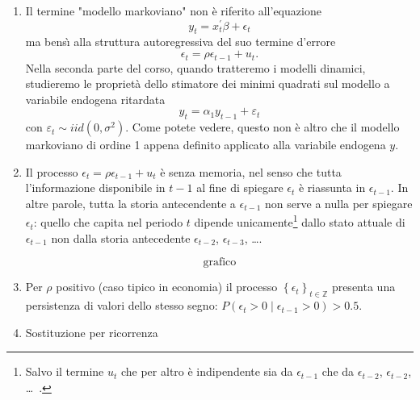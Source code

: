 \documentclass[a4paper]{report}
\newcounter{ese}
\newcounter{def}
\theoremstyle{remark}
\begin{document}
\begin{enumerate}
\item Il termine "modello markoviano" non \`{e} riferito all'equazione%
\begin{equation*}
y_{t}=x_{t}^{\prime }\beta +\epsilon _{t}
\end{equation*}%
ma bens\`{\i} alla struttura autoregressiva del suo termine d'errore 
\begin{equation*}
\epsilon _{t}=\rho \epsilon _{t-1}+u_{t}\text{.}
\end{equation*}%
Nella seconda parte del corso, quando tratteremo i modelli dinamici,
studieremo le propriet\`{a} dello stimatore dei minimi quadrati sul modello
a variabile endogena ritardata 
\begin{equation*}
y_{t}=\alpha _{1}y_{t-1}+\varepsilon _{t}
\end{equation*}%
con $\varepsilon _{t}\sim iid(0,\sigma ^{2})$. Come potete vedere, questo
non \`{e} altro che il modello markoviano di ordine 1 appena definito
applicato alla variabile endogena $y$.

\item Il processo $\epsilon _{t}=\rho \epsilon _{t-1}+u_{t}$ \`{e} senza
memoria, nel senso che tutta l'informazione disponibile in $t-1$ al fine di
spiegare $\epsilon _{t}$ \`{e} riassunta in $\epsilon _{t-1}$. In altre
parole, tutta la storia antecendente a $\epsilon _{t-1}$ non serve a nulla
per spiegare $\epsilon _{t}$: quello che capita nel periodo $t$ dipende
unicamente\footnote{%
Salvo il termine $u_{t}$ che per altro \`{e} indipendente sia da $\epsilon
_{t-1}$ che da $\epsilon _{t-2}$, $\epsilon _{t-2}$, \ldots\ .} dallo stato
attuale di $\epsilon _{t-1}$ non dalla storia antecedente $\epsilon _{t-2}$, 
$\epsilon _{t-3}$, \ldots .

\begin{equation*}
\text{grafico}
\end{equation*}%
\vspace{5cm}

\item Per $\rho $ positivo (caso tipico in economia) il processo $\left\{
\epsilon _{t}\right\} _{t\in \mathbb{Z}}$ presenta una persistenza di valori
dello stesso segno: $P(\epsilon _{t}>0\mid \epsilon _{t-1}>0)>0.5$.

\item Sostituzione per ricorrenza


\end{enumerate}
\end{document}
